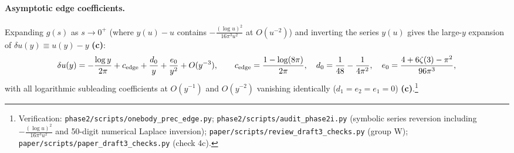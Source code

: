 \documentclass[11pt,a4paper]{article}
\newcommand{\lab}[1]{{\normalfont\sffamily\footnotesize\bfseries(#1)}}
\newcommand{\Lc}{\lab{c}}
\newcommand{\scr}[1]{\nolinkurl{#1}}
\newcommand{\chk}[1]{\footnote{\raggedright Verification: #1.}}
\theoremstyle{remark}
\begin{document}
\paragraph{Asymptotic edge coefficients.} Expanding $g(s)$ as $s\to0^+$ (where $y(u)-u$ contains $-\frac{(\log u)^2}{16\pi^3u^2}$ at $O(u^{-2})$) and inverting the series $y(u)$ gives the large-$y$ expansion of $\delta u(y)\equiv u(y)-y$ \Lc:
\begin{equation}\label{eq:duasymp}
\delta u(y)=-\frac{\log y}{2\pi}+c_{\rm edge}+\frac{d_0}{y}+\frac{e_0}{y^2}+O(y^{-3}),\qquad
c_{\rm edge}=\frac{1-\log(8\pi)}{2\pi},\quad
d_0=\frac1{48}-\frac1{4\pi^2},\quad
e_0=\frac{4+6\zeta(3)-\pi^2}{96\pi^3},
\end{equation}
with all logarithmic subleading coefficients at $O(y^{-1})$ and $O(y^{-2})$ vanishing identically ($d_1=e_2=e_1=0$) \Lc.\chk{\scr{phase2/scripts/onebody_prec_edge.py}; \scr{phase2/scripts/audit_phase2i.py} (symbolic series reversion including $-\frac{(\log u)^2}{16\pi^3u^2}$ and 50-digit numerical Laplace inversion); \scr{paper/scripts/review_draft3_checks.py} (group W); \scr{paper/scripts/paper_draft3_checks.py} (check 4c)}
\end{document}
